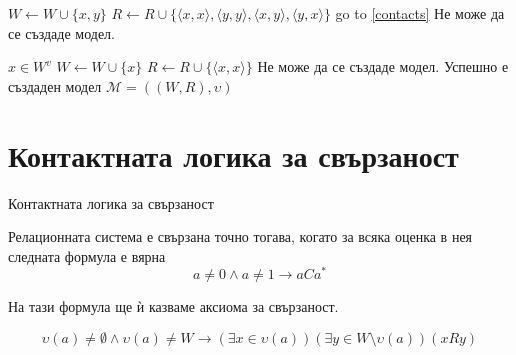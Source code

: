 \documentclass[14pt, aspectratio=169]{beamer}
\makeatletter
\renewcommand\thealgorithm{}
\newcommand{\setalglineno}[1]{\setcounter{ALC@line}{\numexpr#1-1}}
\newcommand\M{\mathcal{M}}
\newcommand{\pair}[2]{ \langle #1, #2 \rangle }
\newcommand{\pairXY}{ \pair{x}{y} }
\newcommand{\pairXX}{ \pair{x}{x} }
\newcommand{\pairYX}{ \pair{y}{x} }
\newcommand{\pairYY}{ \pair{y}{y} }
\makeatother
\begin{document}
\begin{frame}
	\begin{algorithm}[H]
	\renewcommand\thealgorithm{} %
	\begin{algorithmic}[1] %
		\setalglineno{13}
		 \label{contacts}
					\STATE $W \gets W \cup \{x, y \}$
					\STATE $R \gets R \cup \{\pairXX, \pairYY, \pairXY, \pairYX \}$
					\STATE go to \ref{contacts}
				\ENDIF
			\ENDFOR
			\STATE Не може да се създаде модел.
		\ENDFOR
	\end{algorithmic}

	\caption{Алгоритъм за строене на модел}
	\label{alg:seq}
	\end{algorithm}
\end{frame}

\begin{frame}
	\begin{algorithm}[H]
	\renewcommand\thealgorithm{} %
	\begin{algorithmic}[1] %
		\setalglineno{23}
				\STATE $x \in W^v$
				\STATE $W \gets W \cup \{ x \}$
				\STATE $R \gets R \cup \{ \pairXX \}$
			\ELSE
				\STATE Не може да се създаде модел.
			\ENDIF
		\ENDIF
		\STATE Успешно е създаден модел $\M = ((W, R), \upsilon)$
	\end{algorithmic}

	\caption{Алгоритъм за строене на модел}
	\label{alg:seq}
	\end{algorithm}
\end{frame}

\section{Контактната логика за свързаност}

\begin{frame}{Контактната логика за свързаност}
	\begin{lemma}
		Релационната система е свързана точно тогава, когато за всяка оценка в нея следната формула е вярна
	\begin{equation*}
		a \neq 0 \land a \neq 1 \rightarrow aCa^*
	\end{equation*}
	
	На тази формула ще ѝ казваме аксиома за свързаност.
	\end{lemma}
		\begin{equation*}
			\upsilon(a) \neq \emptyset \land \upsilon(a) \neq W \rightarrow (\exists x \in \upsilon(a)) (\exists y \in W \setminus \upsilon(a))(xRy)
		\end{equation*}
\end{frame}
\end{document}
